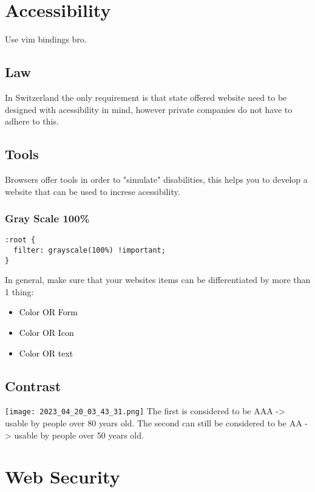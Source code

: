 \documentclass[main.tex,fontsize=8pt,paper=a4,paper=portrait,DIV=calc,]{scrartcl}
\begin{document}
\section{Accessibility}
Use vim bindings bro.

\subsection{Law}
In Switzerland the only requirement is that state offered website need to be designed with acessibility in mind, however private companies do not have to adhere to this.

\subsection{Tools}
Browsers offer tools in order to "simulate" disabilities, this helps you to develop a website that can be used to increse acessibility.

\subsubsection{Gray Scale 100\%}
\begin{lstlisting}
:root {
  filter: grayscale(100%) !important;
}
\end{lstlisting}
In general, make sure that your websites items can be differentiated by more than 1 thing:
\begin{itemize}
\item \textcolor{black}{Color OR Form}
\item \textcolor{black}{Color OR Icon}
\item \textcolor{black}{Color OR text}
\end{itemize} 

\subsection{Contrast}
\texttt{[image: 2023\_04\_20\_03\_43\_31.png]}\newline
The first is considered to  be AAA -> usable by people over 80 years old.\newline
The second can still be considered to be AA -> usable by people over 50 years old.


\section{Web Security}





















\lstset{
    language=HTML,
    style=code,
}
\end{document}

